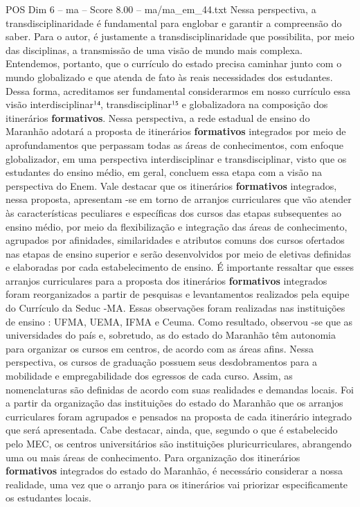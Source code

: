 \begin{textsample}{POS Dim 6 – ma – Score 8.00 – ma/ma\_em\_44.txt}
Nessa perspectiva, a transdisciplinaridade é fundamental para englobar e garantir a compreensão do saber.
Para o autor, é justamente a transdisciplinaridade que possibilita, por meio das disciplinas, a transmissão de uma visão de mundo mais complexa.
Entendemos, portanto, que o currículo do estado precisa caminhar junto com o mundo globalizado e que atenda de fato às reais necessidades dos estudantes.
Dessa forma, acreditamos ser fundamental considerarmos em nosso currículo essa visão interdisciplinar¹⁴, transdisciplinar¹⁵ e globalizadora na composição dos itinerários \textbf{formativos}.
Nessa perspectiva, a rede estadual de ensino do Maranhão adotará a proposta de itinerários \textbf{formativos} integrados por meio de aprofundamentos que perpassam todas as áreas de conhecimentos, com enfoque globalizador, em uma perspectiva interdisciplinar e transdisciplinar, visto que os estudantes do ensino médio, em geral, concluem essa etapa com a visão na perspectiva do Enem.
Vale destacar que os itinerários \textbf{formativos} integrados, nessa proposta, apresentam -se em torno de arranjos curriculares que vão atender às características peculiares e específicas dos cursos das etapas subsequentes ao ensino médio, por meio da flexibilização e integração das áreas de conhecimento, agrupados por afinidades, similaridades e atributos comuns dos cursos ofertados nas etapas de ensino superior e serão desenvolvidos por meio de eletivas definidas e elaboradas por cada estabelecimento de ensino.
É importante ressaltar que esses arranjos curriculares para a proposta dos itinerários \textbf{formativos} integrados foram reorganizados a partir de pesquisas e levantamentos realizados pela equipe do Currículo da Seduc -MA.
Essas observações foram realizadas nas instituições de ensino : UFMA, UEMA, IFMA e Ceuma.
Como resultado, observou -se que as universidades do país e, sobretudo, as do estado do Maranhão têm autonomia para organizar os cursos em centros, de acordo com as áreas afins.
Nessa perspectiva, os cursos de graduação possuem seus desdobramentos para a mobilidade e empregabilidade dos egressos de cada curso.
Assim, as nomenclaturas são definidas de acordo com suas realidades e demandas locais.
Foi a partir da organização das instituições do estado do Maranhão que os arranjos curriculares foram agrupados e pensados na proposta de cada itinerário integrado que será apresentada.
Cabe destacar, ainda, que, segundo o que é estabelecido pelo MEC, os centros universitários são instituições pluricurriculares, abrangendo uma ou mais áreas de conhecimento.
Para organização dos itinerários \textbf{formativos} integrados do estado do Maranhão, é necessário considerar a nossa realidade, uma vez que o arranjo para os itinerários vai priorizar especificamente os estudantes locais.

\end{textsample}
